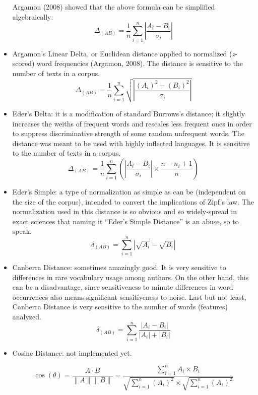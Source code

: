 \documentclass[11pt,a4paper]{article}
\def\margin#1{\marginpar{\textcolor{blue}{\footnotesize\tt #1}}}
\begin{document}
\begin{itemize}
\noindent Argamon (2008) showed that the above formula can be simplified
algebraically: 
\[
\Delta_{(AB)}=\frac{1}{n}\sum_{i=1}^{n}\left\vert \frac{A_{i}-B_{i}}{\sigma_{i}}\right\vert 
\]


\item Argamon's Linear Delta, or Euclidean distance applied to normalized
(\textit{z}-scored) word frequencies (Argamon, 2008).\margin{"AL"}
The distance is sensitive to the number of texts in a corpus. 
\[
\Delta_{(AB)}=\frac{1}{n}\sum_{i=1}^{n}\sqrt{\left\vert \frac{(A_{i})^{2}-(B_{i})^{2}}{\sigma_{i}}\right\vert }
\]

\item Eder's Delta: it is a modification of standard Burrows's distance;\margin{"ED"}
it slightly increases the weiths of frequent words and rescales less
frequent ones in order to suppress discriminative strength of some
random unfrequent words. The distance was meant to be used with highly
inflected languages. It is sensitive to the number of texts in a corpus.
\[
\Delta_{(AB)}=\frac{1}{n}\sum_{i=1}^{n}\left(\left\vert \frac{A_{i}-B_{i}}{\sigma_{i}}\right\vert \times\frac{n-n_{i}+1}{n}\right)
\]

\item Eder's Simple: a type of normalization as simple as can be (independent
on the size of the corpus), intended to convert the implications of
Zipf's law.\margin{"ES"} The normalization
used in this distance is so obvious and so widely-spread in exact
sciences that naming it ``Eder's Simple Distance'' is an abuse, so to
speak. 
\[
\delta_{(AB)}=\sum_{i=1}^{n}\left\vert \sqrt{A_{i}}-\sqrt{B_{i}}\right\vert 
\]

\item Canberra Distance: sometimes amazingly good.\margin{"CB"}
It is very sensitive to differences in rare vocabulary usage among
authors. On the other hand, this can be a disadvantage, since sensitiveness
to minute differences in word occurrences also means significant sensitiveness
to noise. Last but not least, Canberra Distance is very sensitive
to the number of words (features) analyzed. 
\[
\delta_{(AB)}=\sum_{i=1}^{n}\frac{\left\vert A_{i}-B_{i}\right\vert }{\left\vert A_{i}\right\vert +\left\vert B_{i}\right\vert }
\]

\item Cosine Distance: not implemented yet.\margin{[TBD]}


\[
\cos(\theta)=\frac{A\cdot B}{\|A\|\|B\|}=\frac{\sum\limits _{i=1}^{n}{A_{i}\times B_{i}}}{\sqrt{\sum\limits _{i=1}^{n}{(A_{i})^{2}}}\times\sqrt{\sum\limits _{i=1}^{n}{(A_{i})^{2}}}}
\]





\end{itemize}
\end{document}
